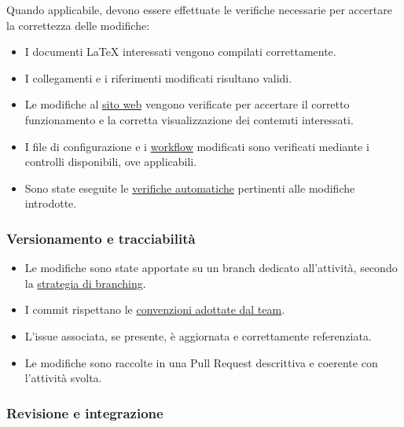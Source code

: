 \documentclass[11pt, a4paper]{article}
\begin{document}
Quando applicabile, devono essere effettuate le verifiche necessarie per accertare la correttezza delle modifiche:

\begin{itemize}
    \item I documenti LaTeX interessati vengono compilati correttamente.
    \item I collegamenti e i riferimenti modificati risultano validi.
    \item Le modifiche al \href{https://on-by-one-team.github.io/On-By-One.github.io/}{sito web} vengono verificate per accertare il corretto funzionamento e la corretta visualizzazione dei contenuti interessati.
    \item I file di configurazione e i \href{https://github.com/On-By-One-Team/On-By-One.github.io/tree/main/.github/workflows}{workflow} modificati sono verificati mediante i controlli disponibili, ove applicabili.
    \item Sono state eseguite le \href{https://github.com/On-By-One-Team/On-By-One.github.io/tree/main/.github/workflows}{verifiche automatiche} pertinenti alle modifiche introdotte.
\end{itemize}

\subsubsection{Versionamento e tracciabilità}

\begin{itemize}
    \item Le modifiche sono state apportate su un branch dedicato all'attività, secondo la \hyperref[subsec:creazione-dei-branch]{strategia di branching}.
    \item I commit rispettano le \hyperref[sec:linee-guida-per-i-commit]{convenzioni adottate dal team}.
    \item L'issue associata, se presente, è aggiornata e correttamente referenziata.
    \item Le modifiche sono raccolte in una Pull Request descrittiva e coerente con l'attività svolta.
\end{itemize}

\subsubsection{Revisione e integrazione}
\end{document}
